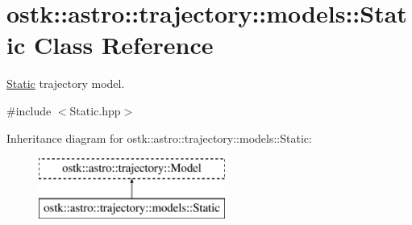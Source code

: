 \hypertarget{classostk_1_1astro_1_1trajectory_1_1models_1_1_static}{}\section{ostk\+:\+:astro\+:\+:trajectory\+:\+:models\+:\+:Static Class Reference}
\label{classostk_1_1astro_1_1trajectory_1_1models_1_1_static}


\hyperlink{classostk_1_1astro_1_1trajectory_1_1models_1_1_static}{Static} trajectory model.  




{\ttfamily \#include $<$Static.\+hpp$>$}

Inheritance diagram for ostk\+:\+:astro\+:\+:trajectory\+:\+:models\+:\+:Static\+:\begin{figure}[H]
\begin{center}
\leavevmode
\includegraphics[height=2.000000cm]{classostk_1_1astro_1_1trajectory_1_1models_1_1_static}
\end{center}
\end{figure}
